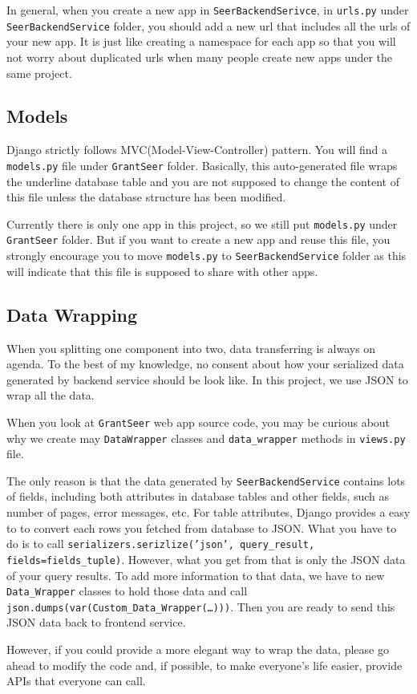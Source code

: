 \documentclass[12pt]{article}
\begin{document}
In general, when you create a new app in \texttt{SeerBackendSerivce}, in \texttt{urls.py} under \texttt{SeerBackendService} folder, you should add a new url that includes all the urls of your new app. It is just like creating a namespace for each app so that you will not worry about duplicated urls when many people create new apps under the same project.

\subsection*{Models}
Django strictly follows MVC(Model-View-Controller) pattern. You will find a \texttt{models.py} file under \texttt{GrantSeer} folder. Basically, this auto-generated file wraps the underline database table and you are not supposed to change the content of this file unless the database structure has been modified.

Currently there is only one app in this project, so we still put \texttt{models.py} under \texttt{GrantSeer} folder. But if you want to create a new app and reuse this file, you strongly encourage you to move \texttt{models.py} to \texttt{SeerBackendService} folder as this will indicate that this file is supposed to share with other apps.

\subsection*{Data Wrapping}
When you splitting one component into two, data transferring is always on agenda. To the best of my knowledge, no consent about how your serialized data generated by backend service should be look like. In this project, we use JSON to wrap all the data.

When you look at \texttt{GrantSeer} web app source code, you may be curious about why we create may \texttt{DataWrapper} classes and \texttt{data\_wrapper} methods in \texttt{views.py} file.

The only reason is that the data generated by \texttt{SeerBackendService} contains lots of fields, including both attributes in database tables and other fields, such as number of pages, error messages, etc. For table attributes, Django provides a easy to to convert each rows you fetched from database to JSON. What you have to do is to call \texttt{serializers.serizlize('json', query\_result, fields=fields\_tuple)}. However, what you get from that is only the JSON data of your query results. To add more information to that data, we have to new \texttt{Data\_Wrapper} classes to hold those data and call \texttt{json.dumps(var(Custom\_Data\_Wrapper(\dots)))}. Then you are ready to send this JSON data back to frontend service.

However, if you could provide a more elegant way to wrap the data, please go ahead to modify the code and, if possible, to make everyone's life easier, provide APIs that everyone can call.
\end{document}
